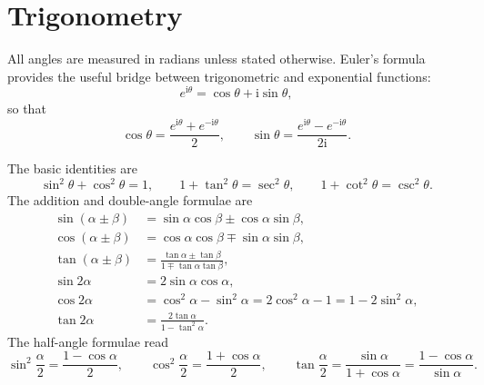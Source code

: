 \section{Trigonometry}

All angles are measured in radians unless stated otherwise. Euler's formula provides the useful bridge between trigonometric and exponential functions:
\begin{equation}
e^{\mathrm{i}\theta}=\cos\theta+\mathrm{i}\sin\theta,
\end{equation}
so that
\begin{equation}
\cos\theta=\frac{e^{\mathrm{i}\theta}+e^{-\mathrm{i}\theta}}{2},
\qquad
\sin\theta=\frac{e^{\mathrm{i}\theta}-e^{-\mathrm{i}\theta}}{2\mathrm{i}}.
\end{equation}

The basic identities are
\begin{equation}
\sin^2\theta+\cos^2\theta=1,
\qquad
1+\tan^2\theta=\sec^2\theta,
\qquad
1+\cot^2\theta=\csc^2\theta.
\end{equation}
The addition and double-angle formulae are
\begin{align}
\sin(\alpha\pm\beta)&=\sin\alpha\cos\beta\pm\cos\alpha\sin\beta,\\
\cos(\alpha\pm\beta)&=\cos\alpha\cos\beta\mp\sin\alpha\sin\beta,\\
\tan(\alpha\pm\beta)&=\frac{\tan\alpha\pm\tan\beta}{1\mp\tan\alpha\tan\beta},\\
\sin 2\alpha&=2\sin\alpha\cos\alpha,\\
\cos 2\alpha&=\cos^2\alpha-\sin^2\alpha=2\cos^2\alpha-1=1-2\sin^2\alpha,\\
\tan 2\alpha&=\frac{2\tan\alpha}{1-\tan^2\alpha}.
\end{align}
The half-angle formulae read
\begin{equation}
\sin^2\frac{\alpha}{2}=\frac{1-\cos\alpha}{2},
\qquad
\cos^2\frac{\alpha}{2}=\frac{1+\cos\alpha}{2},
\qquad
\tan\frac{\alpha}{2}=\frac{\sin\alpha}{1+\cos\alpha}=\frac{1-\cos\alpha}{\sin\alpha}.
\end{equation}

